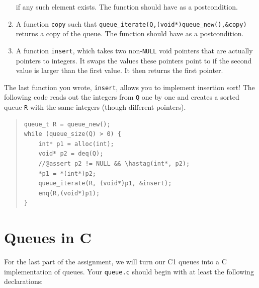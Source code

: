 \documentclass[12pt]{exam}
\begin{document}
\begin{task}[6]
\begin{enumerate}
  if any such element exists. The function should have
   as a postcondition.
\item%
  A function \lstinline'copy' such that
  \lstinline'queue_iterate(Q,(void*)queue_new(),&copy)' returns a copy
  of the queue.  The function should have 
  as a postcondition.
\item%
  A function \lstinline'insert', which takes two non-\lstinline'NULL'
  void pointers that are actually pointers to integers.  It swaps the
  values these pointers point to if the second value is larger than the
  first value.  It then returns the first pointer.
\end{enumerate}
\end{task}

\noindent
The last function you wrote, \lstinline'insert', allows you to
implement insertion sort!  The following code reads out the integers
from \lstinline'Q' one by one and creates a sorted queue \lstinline'R'
with the same integers (though different pointers).

\begin{quote}
\begin{lstlisting}[numbers=none]
queue_t R = queue_new();
while (queue_size(Q) > 0) {
    int* p1 = alloc(int);
    void* p2 = deq(Q);
    //@assert p2 != NULL && \hastag(int*, p2);
    *p1 = *(int*)p2;
    queue_iterate(R, (void*)p1, &insert);
    enq(R,(void*)p1);
}
\end{lstlisting}
\end{quote}


\clearpage
\section{Queues in C}
\label{sec:C1toC}

For the last part of the assignment, we will turn our C1 queues into a
C implementation of queues.  Your \lstinline'queue.c' should begin
with at least the following declarations:
\end{document}
